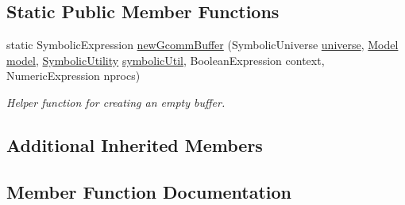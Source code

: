 \subsection*{Static Public Member Functions}
\begin{DoxyCompactItemize}
\item 
static Symbolic\+Expression \hyperlink{classedu_1_1udel_1_1cis_1_1vsl_1_1civl_1_1library_1_1comm_1_1LibcommExecutor_a18a75c375b70ca4909f2bafdcea13764}{new\+Gcomm\+Buffer} (Symbolic\+Universe \hyperlink{classedu_1_1udel_1_1cis_1_1vsl_1_1civl_1_1library_1_1common_1_1LibraryComponent_a15e177f8c241bccac36c3ac9fd65a0b7}{universe}, \hyperlink{interfaceedu_1_1udel_1_1cis_1_1vsl_1_1civl_1_1model_1_1IF_1_1Model}{Model} \hyperlink{classedu_1_1udel_1_1cis_1_1vsl_1_1civl_1_1library_1_1common_1_1LibraryComponent_a793947b7f5a2562067a2e4a81f1097cb}{model}, \hyperlink{interfaceedu_1_1udel_1_1cis_1_1vsl_1_1civl_1_1dynamic_1_1IF_1_1SymbolicUtility}{Symbolic\+Utility} \hyperlink{classedu_1_1udel_1_1cis_1_1vsl_1_1civl_1_1library_1_1common_1_1LibraryComponent_a18214426269e7c352f4926264837c8a6}{symbolic\+Util}, Boolean\+Expression context, Numeric\+Expression nprocs)
\begin{DoxyCompactList}\small\item\em Helper function for creating an empty buffer. \end{DoxyCompactList}\end{DoxyCompactItemize}
\subsection*{Additional Inherited Members}


\subsection{Member Function Documentation}
\hypertarget{classedu_1_1udel_1_1cis_1_1vsl_1_1civl_1_1library_1_1comm_1_1LibcommExecutor_a63cdf3422becd2d35181bc01408f7f2a}{}
